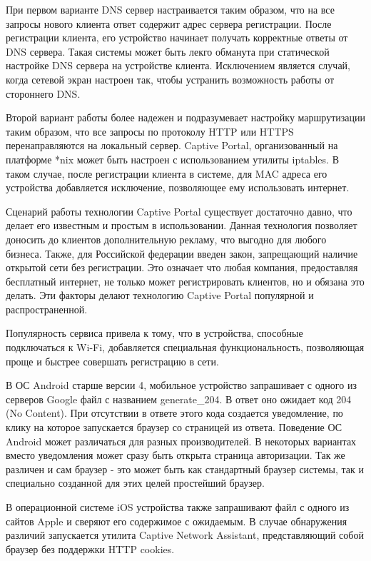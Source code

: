 При первом варианте DNS сервер настраивается таким образом, что на все запросы нового клиента ответ содержит адрес сервера регистрации. После регистрации клиента, его устройство начинает получать корректные ответы от DNS сервера. Такая системы может быть лекго обманута при статической настройке DNS сервера на устройстве клиента. Исключением является случай, когда сетевой экран настроен так, чтобы устранить возможность работы от стороннего DNS.

Второй вариант работы более надежен и подразумевает настройку маршрутизации таким образом, что все запросы по протоколу HTTP или HTTPS перенаправляются на локальный сервер. Captive Portal, организованный на платформе *nix может быть настроен с использованием утилиты iptables. В таком случае, после регистрации клиента в системе, для MAC адреса его устройства добавляется исключение, позволяющее ему использовать интернет.

Сценарий работы технологии Captive Portal существует достаточно давно, что делает его известным и простым в использовании. Данная технология позволяет доносить до клиентов дополнительную рекламу, что выгодно для любого бизнеса. Также, для Российской федерации введен закон, запрещающий наличие открытой сети без регистрации. Это означает что любая компания, предоставляя бесплатный интернет, не только может регистрировать клиентов, но и обязана это делать. Эти факторы делают технологию Captive Portal популярной и распространенной. 

Популярность сервиса привела к тому, что в устройства, способные подключаться к Wi-Fi, добавляется специальная функциональность, позволяющая проще и быстрее совершать регистрацию в сети. 

В ОС Android старше версии 4, мобильное устройство запрашивает с одного из серверов Google файл с названием generate\_204. В ответ оно ожидает код 204 (No Content). При отсутствии в ответе этого кода создается уведомление, по клику на которое запускается браузер со страницей из ответа. Поведение ОС Android может различаться для разных производителей. В некоторых вариантах вместо уведомления может сразу быть открыта страница авторизации. Так же различен и сам браузер - это может быть как стандартный браузер системы, так и специально созданной для этих целей простейший браузер.

В операционной системе iOS устройства также запрашивают файл с одного из сайтов Apple и сверяют его содержимое с ожидаемым. В случае обнаружения различий запускается утилита Captive Network Assistant, представляющий собой браузер без поддержки HTTP cookies.

